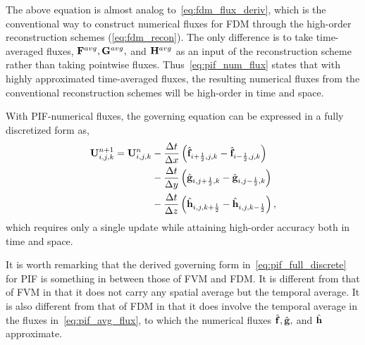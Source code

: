 The above equation is almost analog to~\cref{eq:fdm_flux_deriv},
which is the conventional way to construct numerical fluxes for FDM through
the high-order reconstruction schemes (\cref{eq:fdm_recon}).
The only difference is to take time-averaged fluxes, \( \mathbf{F}^{avg}, \mathbf{G}^{avg}, \) and \( \mathbf{H}^{avg} \)
as an input of the reconstruction scheme rather than taking pointwise fluxes.
Thus~\cref{eq:pif_num_flux} states that with highly approximated time-averaged fluxes,
the resulting numerical fluxes from the conventional reconstruction schemes will be high-order in time and space.

With PIF-numerical fluxes, the governing equation can be expressed in a fully discretized form as,
\begin{equation}\label{eq:pif_full_discrete}
    \begin{split}
        \mathbf{U}^{n + 1}_{i,j,k} = \mathbf{U}^{n}_{i,j,k} &- \frac{\Delta t}{\Delta x} \left( \hat{\mathbf{f}}_{{i+\frac{1}{2}},j,k} - \hat{\mathbf{f}}_{{i-\frac{1}{2}},j,k} \right) \\
                                              &- \frac{\Delta t}{\Delta y} \left( \hat{\mathbf{g}}_{i, {j+\frac{1}{2}}, k} - \hat{\mathbf{g}}_{i, {j-\frac{1}{2}}, k} \right) \\
                                              &- \frac{\Delta t}{\Delta z} \left( \hat{\mathbf{h}}_{i, j, {k+\frac{1}{2}}} - \hat{\mathbf{h}}_{i, j, {k-\frac{1}{2}}} \right),
    \end{split}
\end{equation}
which requires only a single update while attaining high-order accuracy both in time and space.

It is worth remarking that the derived governing form in~\cref{eq:pif_full_discrete} for PIF
is something in between those of FVM and FDM\@. It is different from that of FVM in that
it does not carry any spatial average but the temporal average.
It is also different from that of FDM in that it does involve the temporal average in the fluxes in~\cref{eq:pif_avg_flux},
to which the numerical fluxes \( \hat{\mathbf{f}}, \hat{\mathbf{g}}, \) and \( \hat{\mathbf{h}} \) approximate.

